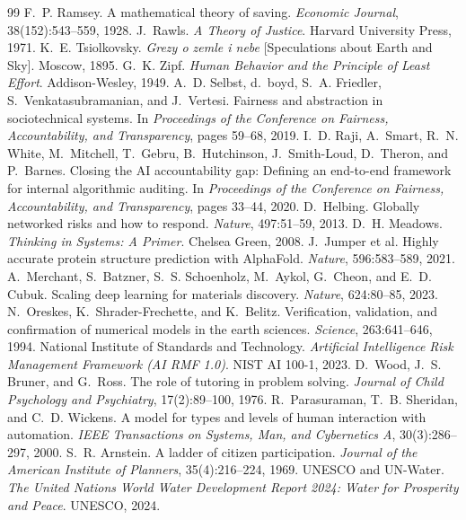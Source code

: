 \begin{thebibliography}{99}
 F.~P. Ramsey. A mathematical theory of saving. \emph{Economic Journal}, 38(152):543--559, 1928.
 J.~Rawls. \emph{A Theory of Justice}. Harvard University Press, 1971.
 K.~E. Tsiolkovsky. \emph{Grezy o zemle i nebe} [Speculations about Earth and Sky]. Moscow, 1895.
 G.~K. Zipf. \emph{Human Behavior and the Principle of Least Effort}. Addison-Wesley, 1949.
 A.~D. Selbst, d.~boyd, S.~A. Friedler, S.~Venkatasubramanian, and J.~Vertesi. Fairness and abstraction in sociotechnical systems. In \emph{Proceedings of the Conference on Fairness, Accountability, and Transparency}, pages 59--68, 2019.
 I.~D. Raji, A.~Smart, R.~N. White, M.~Mitchell, T.~Gebru, B.~Hutchinson, J.~Smith-Loud, D.~Theron, and P.~Barnes. Closing the AI accountability gap: Defining an end-to-end framework for internal algorithmic auditing. In \emph{Proceedings of the Conference on Fairness, Accountability, and Transparency}, pages 33--44, 2020.
 D.~Helbing. Globally networked risks and how to respond. \emph{Nature}, 497:51--59, 2013.
 D.~H. Meadows. \emph{Thinking in Systems: A Primer}. Chelsea Green, 2008.
 J.~Jumper et al. Highly accurate protein structure prediction with AlphaFold. \emph{Nature}, 596:583--589, 2021.
 A.~Merchant, S.~Batzner, S.~S. Schoenholz, M.~Aykol, G.~Cheon, and E.~D. Cubuk. Scaling deep learning for materials discovery. \emph{Nature}, 624:80--85, 2023.
 N.~Oreskes, K.~Shrader-Frechette, and K.~Belitz. Verification, validation, and confirmation of numerical models in the earth sciences. \emph{Science}, 263:641--646, 1994.
 National Institute of Standards and Technology. \emph{Artificial Intelligence Risk Management Framework (AI RMF 1.0)}. NIST AI 100-1, 2023.
 D.~Wood, J.~S. Bruner, and G.~Ross. The role of tutoring in problem solving. \emph{Journal of Child Psychology and Psychiatry}, 17(2):89--100, 1976.
 R.~Parasuraman, T.~B. Sheridan, and C.~D. Wickens. A model for types and levels of human interaction with automation. \emph{IEEE Transactions on Systems, Man, and Cybernetics A}, 30(3):286--297, 2000.
 S.~R. Arnstein. A ladder of citizen participation. \emph{Journal of the American Institute of Planners}, 35(4):216--224, 1969.
 UNESCO and UN-Water. \emph{The United Nations World Water Development Report 2024: Water for Prosperity and Peace}. UNESCO, 2024.

\end{thebibliography}
